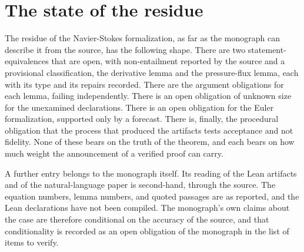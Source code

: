 \section{The state of the residue}

The residue of the Navier-Stokes formalization, as far as the monograph can describe it from the source, has the following shape. There are two statement-equivalences that are open, with non-entailment reported by the source and a provisional classification, the derivative lemma and the pressure-flux lemma, each with its type and its repairs recorded. There are the argument obligations for each lemma, failing independently. There is an open obligation of unknown size for the unexamined declarations. There is an open obligation for the Euler formalization, supported only by a forecast. There is, finally, the procedural obligation that the process that produced the artifacts tests acceptance and not fidelity. None of these bears on the truth of the theorem, and each bears on how much weight the announcement of a verified proof can carry.

A further entry belongs to the monograph itself. Its reading of the Lean artifacts and of the natural-language paper is second-hand, through the source. The equation numbers, lemma numbers, and quoted passages are as reported, and the Lean declarations have not been compiled. The monograph's own claims about the case are therefore conditional on the accuracy of the source, and that conditionality is recorded as an open obligation of the monograph in the list of items to verify.
